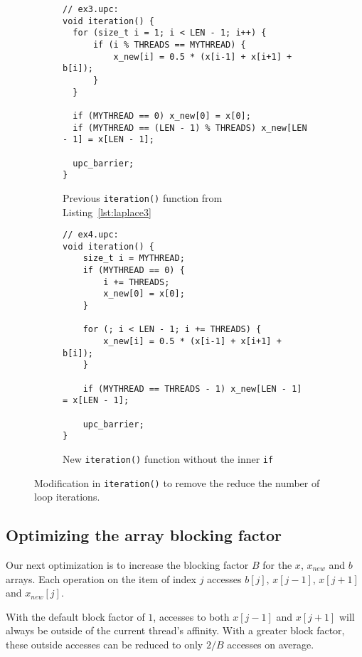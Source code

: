 \documentclass[12pt]{article}
\begin{document}
\begin{figure}[ht]
  \begin{subfigure}[b]{0.49\columnwidth}
    \begin{lstlisting}[style=C, numbers=none]
// ex3.upc:
void iteration() {
  for (size_t i = 1; i < LEN - 1; i++) {
      if (i % THREADS == MYTHREAD) {
          x_new[i] = 0.5 * (x[i-1] + x[i+1] + b[i]);
      }
  }

  if (MYTHREAD == 0) x_new[0] = x[0];
  if (MYTHREAD == (LEN - 1) % THREADS) x_new[LEN - 1] = x[LEN - 1];

  upc_barrier;
}
    \end{lstlisting}
    \caption{Previous \texttt{iteration()} function from Listing~\ref{lst:laplace3}}
  \end{subfigure}
  \hfill
  \begin{subfigure}[b]{0.49\columnwidth}
    \begin{lstlisting}[style=C, numbers=none]
// ex4.upc:
void iteration() {
    size_t i = MYTHREAD;
    if (MYTHREAD == 0) {
        i += THREADS;
        x_new[0] = x[0];
    }

    for (; i < LEN - 1; i += THREADS) {
        x_new[i] = 0.5 * (x[i-1] + x[i+1] + b[i]);
    }

    if (MYTHREAD == THREADS - 1) x_new[LEN - 1] = x[LEN - 1];

    upc_barrier;
}
    \end{lstlisting}
    \caption{New \texttt{iteration()} function without the inner \texttt{if}}
  \end{subfigure}
  \caption{Modification in \texttt{iteration()} to remove the reduce the number of loop iterations.}
  \label{fig:laplace34}
\end{figure}

% 

\subsection{Optimizing the array blocking factor}
\label{sec:laplace5}

Our next optimization is to increase the blocking factor $B$ for the $x$, $x_{new}$ and $b$ arrays.
Each operation on the item of index $j$ accesses $b[j]$, $x[j-1]$, $x[j+1]$ and $x_{new}[j]$.

With the default block factor of $1$, accesses to both $x[j-1]$ and $x[j+1]$ will always be outside of the current thread's affinity.
With a greater block factor, these outside accesses can be reduced to only $2/B$ accesses on average.
\end{document}
